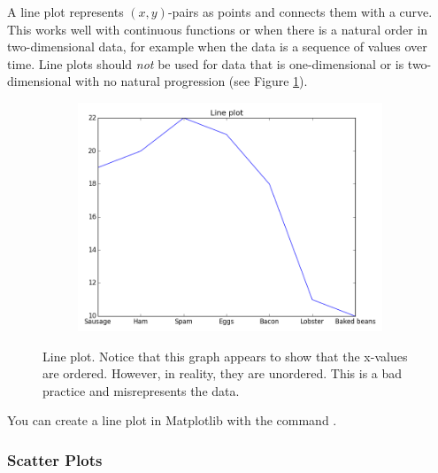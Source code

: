 A line plot represents $(x,y)$-pairs as points and connects them with a curve.
This works well with continuous functions or when there is a natural order in two-dimensional data, for example when the data is a sequence of values over time.
Line plots should \emph{not} be used for data that is one-dimensional or is two-dimensional with no natural
progression (see Figure \ref{fig:lineplotbadX}). %

\begin{figure}[h]
\centering
\begin{subfigure}{.5\textwidth}
\centering
\includegraphics[width=\textwidth]{line_plot_bad_X.png}
\end{subfigure}
\caption{Line plot.  Notice that this graph appears to show that the x-values are ordered.  However, in reality, they are unordered.  This is a bad practice and misrepresents the data.}
\label{fig:lineplotbadX}
\end{figure}

You can create a line plot in Matplotlib with the command .

\subsubsection*{Scatter Plots} %

